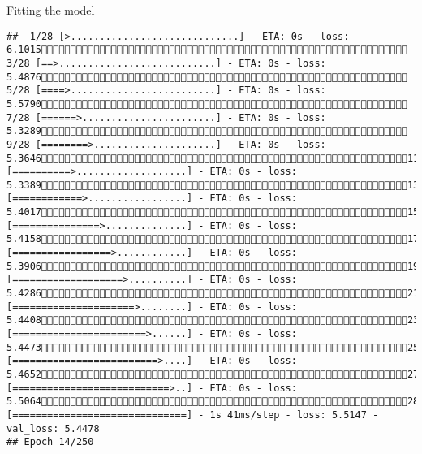 \documentclass[
  ignorenonframetext,
]{beamer}
\begin{document}
\begin{frame}[fragile]{Fitting the model}
\begin{verbatim}
##  1/28 [>.............................] - ETA: 0s - loss: 6.1015 3/28 [==>...........................] - ETA: 0s - loss: 5.4876 5/28 [====>.........................] - ETA: 0s - loss: 5.5790 7/28 [======>.......................] - ETA: 0s - loss: 5.3289 9/28 [========>.....................] - ETA: 0s - loss: 5.364611/28 [==========>...................] - ETA: 0s - loss: 5.338913/28 [============>.................] - ETA: 0s - loss: 5.401715/28 [===============>..............] - ETA: 0s - loss: 5.415817/28 [=================>............] - ETA: 0s - loss: 5.390619/28 [===================>..........] - ETA: 0s - loss: 5.428621/28 [=====================>........] - ETA: 0s - loss: 5.440823/28 [=======================>......] - ETA: 0s - loss: 5.447325/28 [=========================>....] - ETA: 0s - loss: 5.465227/28 [===========================>..] - ETA: 0s - loss: 5.506428/28 [==============================] - 1s 41ms/step - loss: 5.5147 - val_loss: 5.4478
## Epoch 14/250

\end{verbatim}
\end{frame}
\end{document}
